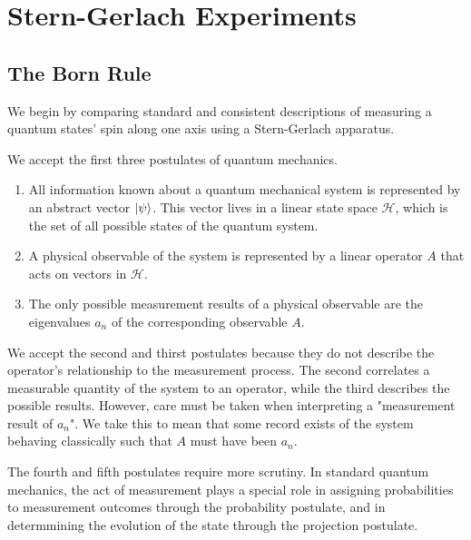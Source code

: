 \usetikzlibrary{shapes.geometric}
\usetikzlibrary{positioning}

\newcommand{\apparatus}[4]{\node[square node] (#1) at (#2,#3){#4};
                           \node[port] (#1+) at (#2 + 0.375, #3 + 0.5){+};
                           \node[port] (#1-) at (#2 + 0.375, #3 - 0.5){-};}

\part{Stern-Gerlach Experiments}

\chapter{The Born Rule}
We begin by comparing standard and consistent descriptions of measuring a quantum states' spin along one axis using a Stern-Gerlach apparatus.

We accept the first three postulates of quantum mechanics.

\begin{enumerate}
    \item All information known about a quantum mechanical system is represented by an abstract vector $\ket{\psi}$. This vector lives in a linear state space $\mathcal{H}$, which is the set of all possible states of the quantum system.
    \item A physical observable of the system is represented by a linear operator $A$ that acts on vectors in $\mathcal{H}$.
    \item The only possible measurement results of a physical observable are the eigenvalues $a_n$ of the corresponding observable $A$.
\end{enumerate}

We accept the second and thirst postulates because they do not describe the operator's relationship to the measurement process. The second correlates a measurable quantity of the system to an operator, while the third describes the possible results. However, care must be taken when interpreting a "measurement result of $a_n$". We take this to mean that some record exists of the system behaving classically such that $A$ must have been $a_n$.

The fourth and fifth postulates require more scrutiny. In standard quantum mechanics, the act of measurement plays a special role in assigning probabilities to measurement outcomes through the probability postulate, and in determmining the evolution of the state through the projection postulate.

